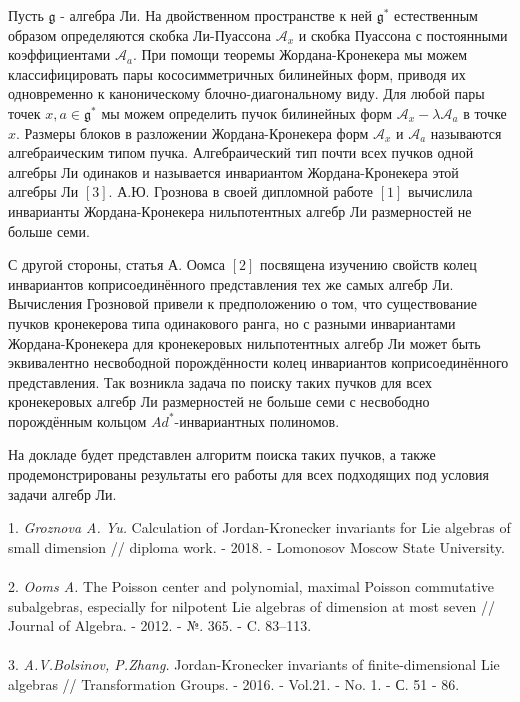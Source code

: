 

\vzmscaption



Пусть $\mathfrak{g}$ - алгебра Ли. На двойственном пространстве к ней $\mathfrak{g}^{\ast}$ естественным образом определяются скобка Ли-Пуассона $\mathcal{A}_{x}$ и скобка Пуассона с постоянными коэффициентами $\mathcal{A}_{a}$. При помощи теоремы Жордана-Кронекера мы можем классифицировать пары кососимметричных билинейных форм, приводя их одновременно к каноническому блочно-диагональному виду. Для любой пары точек $x,a \in\mathfrak{g}^{\ast}$ мы можем определить пучок билинейных форм $\mathcal{A}_{x} - \lambda \mathcal{A}_{a}$ в точке $x$. Размеры блоков в разложении Жордана-Кро\-не\-ке\-ра форм $\mathcal{A}_{x}$ и $\mathcal{A}_{a}$ называются алгебраическим типом пучка. Алгебраический тип почти всех пучков одной алгебры Ли одинаков и называется инвариантом Жордана-Кронекера этой алгебры Ли $\left[ 3 \right]$. А.Ю. Грознова в своей дипломной работе $\left[ 1 \right]$ вычислила инварианты Жордана-Кронекера нильпотентных алгебр Ли размерностей не больше семи.

С другой стороны, статья А. Оомса $\left[ 2 \right] $ посвящена изучению свойств колец инвариантов коприсоединённого представления тех же самых алгебр Ли. Вычисления Грозновой привели к предположению о том, что существование пучков кронекерова типа одинакового ранга, но с разными инвариантами Жордана-Кронекера для кронекеровых нильпотентных алгебр Ли может быть эквивалентно несвободной порождённости колец инвариантов коприсоединённого представления. Так возникла задача по поиску таких пучков для всех кронекеровых алгебр Ли размерностей не больше семи с несвободно порождённым кольцом $Ad^{\ast}$-инвариантных полиномов.

На докладе будет представлен алгоритм поиска таких пучков, а также продемонстрированы результаты его работы для всех подходящих под условия задачи алгебр Ли.

\litlist


1. {\it Groznova A. Yu.}
Calculation of Jordan-Kronecker in\-va\-riants for Lie algebras of small dimension // diploma work. - 2018. - Lomonosov Moscow State University.\\
\\
2. {\it Ooms A.} 
The Poisson center and polynomial, maximal Poisson commutative subalgebras, especially for nilpotent Lie algebras of dimension at most seven // Journal of Algebra. - 2012. - №. 365. - C. 83--113.\\
\\
3. {\it A.V.Bolsinov, P.Zhang.} 
Jordan-Kronecker invariants of finite-dimensional Lie algebras // Transformation Groups. - 2016. -   Vol.21. - No. 1. -  С. 51 - 86.

